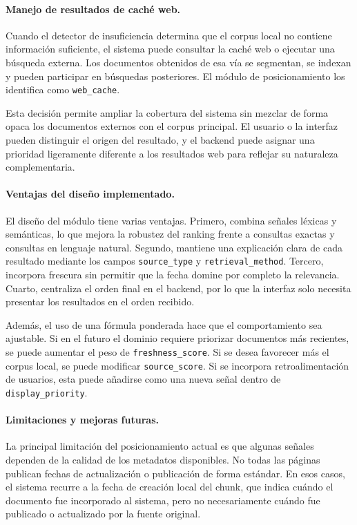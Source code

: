 \documentclass[11pt]{article}
\begin{document}
\paragraph{Manejo de resultados de caché web.}
Cuando el detector de insuficiencia determina que el corpus local no contiene información
suficiente, el sistema puede consultar la caché web o ejecutar una búsqueda externa. Los
documentos obtenidos de esa vía se segmentan, se indexan y pueden participar en búsquedas
posteriores. El módulo de posicionamiento los identifica como \texttt{web\_cache}.

Esta decisión permite ampliar la cobertura del sistema sin mezclar de forma opaca los documentos
externos con el corpus principal. El usuario o la interfaz pueden distinguir el origen del
resultado, y el backend puede asignar una prioridad ligeramente diferente a los resultados web
para reflejar su naturaleza complementaria.

\paragraph{Ventajas del diseño implementado.}
El diseño del módulo tiene varias ventajas. Primero, combina señales léxicas y semánticas, lo que
mejora la robustez del ranking frente a consultas exactas y consultas en lenguaje natural.
Segundo, mantiene una explicación clara de cada resultado mediante los campos
\texttt{source\_type} y \texttt{retrieval\_method}. Tercero, incorpora frescura sin permitir que
la fecha domine por completo la relevancia. Cuarto, centraliza el orden final en el backend, por
lo que la interfaz solo necesita presentar los resultados en el orden recibido.

Además, el uso de una fórmula ponderada hace que el comportamiento sea ajustable. Si en el futuro
el dominio requiere priorizar documentos más recientes, se puede aumentar el peso de
\texttt{freshness\_score}. Si se desea favorecer más el corpus local, se puede modificar
\texttt{source\_score}. Si se incorpora retroalimentación de usuarios, esta puede añadirse como
una nueva señal dentro de \texttt{display\_priority}.

\paragraph{Limitaciones y mejoras futuras.}
La principal limitación del posicionamiento actual es que algunas señales dependen de la calidad
de los metadatos disponibles. No todas las páginas publican fechas de actualización o publicación
de forma estándar. En esos casos, el sistema recurre a la fecha de creación local del chunk, que
indica cuándo el documento fue incorporado al sistema, pero no necesariamente cuándo fue
publicado o actualizado por la fuente original.
\end{document}
